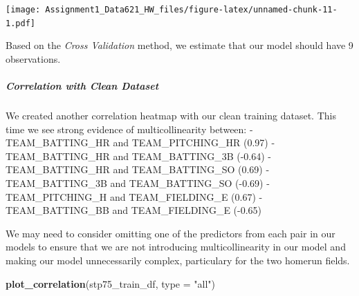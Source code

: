\documentclass[
]{article}
\newenvironment{Shaded}{\begin{snugshade}}{\end{snugshade}}
\newcommand{\AttributeTok}[1]{\textcolor[rgb]{0.13,0.29,0.53}{#1}}
\newcommand{\CommentTok}[1]{\textcolor[rgb]{0.56,0.35,0.01}{\textit{#1}}}
\newcommand{\DecValTok}[1]{\textcolor[rgb]{0.00,0.00,0.81}{#1}}
\newcommand{\FunctionTok}[1]{\textcolor[rgb]{0.13,0.29,0.53}{\textbf{#1}}}
\newcommand{\NormalTok}[1]{#1}
\newcommand{\OtherTok}[1]{\textcolor[rgb]{0.56,0.35,0.01}{#1}}
\newcommand{\SpecialCharTok}[1]{\textcolor[rgb]{0.81,0.36,0.00}{\textbf{#1}}}
\newcommand{\StringTok}[1]{\textcolor[rgb]{0.31,0.60,0.02}{#1}}
\begin{document}
\begin{Shaded}
\end{Shaded}

\texttt{[image: Assignment1\_Data621\_HW\_files/figure-latex/unnamed-chunk-11-1.pdf]}

Based on the \emph{Cross Validation} method, we estimate that our model
should have 9 observations.

\subparagraph{Correlation with Clean
Dataset}\label{correlation-with-clean-dataset}

We created another correlation heatmap with our clean training dataset.
This time we see strong evidence of multicollinearity between: -
TEAM\_BATTING\_HR and TEAM\_PITCHING\_HR (0.97) - TEAM\_BATTING\_HR and
TEAM\_BATTING\_3B (-0.64) - TEAM\_BATTING\_HR and TEAM\_BATTING\_SO
(0.69) - TEAM\_BATTING\_3B and TEAM\_BATTING\_SO (-0.69) -
TEAM\_PITCHING\_H and TEAM\_FIELDING\_E (0.67) - TEAM\_BATTING\_BB and
TEAM\_FIELDING\_E (-0.65)

We may need to consider omitting one of the predictors from each pair in
our models to ensure that we are not introducing multicollinearity in
our model and making our model unnecessarily complex, particulary for
the two homerun fields.

\begin{Shaded}
\begin{Highlighting}[]
\FunctionTok{plot\_correlation}\NormalTok{(stp75\_train\_df, }\AttributeTok{type =} \StringTok{"all"}\NormalTok{)}
\end{Highlighting}
\end{Shaded}
\end{document}
